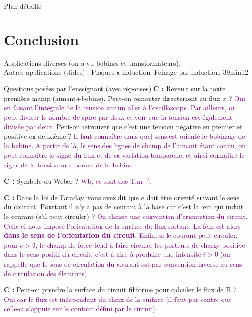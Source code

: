 \begin{reportBlock}{Plan détaillé}
\vspace{1cm}
\section*{Conclusion} 
Applications diverses (on a vu bobines et transformateurs). \\
Autres applications (slides) : Plaques à induction, Feinage par induction.\newline
39min12
\end{reportBlock}


\begin{reportBlock}{Questions posées par l’enseignant (avec réponses)}
  \textbf{C :} Revenir sur la toute première manip (aimant+bobine). Peut-on remonter directement au flux $\phi$ ? \textcolor{purple}{Oui en faisant l'intégrale de la tension sur un aller à l'oscilloscope. Par ailleurs, on peut diviser le nombre de spire par deux et voir que la tension est également divisée par deux.} Peut-on retrouver que c'est une tension négative en premier et positive en deuxième ? \textcolor{purple}{Il faut connaître dans quel sens est orienté le bobinage de la bobine. A partir de là, le sens des lignes de champ de l'aimant étant connu, on peut connaître le signe du flux et de sa variation temporelle, et ainsi connaître le signe de la tension aux bornes de la bobine.}\newline
  
  \textbf{C :} Symbole du Weber ? \textcolor{purple}{Wb, ce sont des T.m$^{-2}$.}\newline
  
  \textbf{C :} Dans la loi de Faraday, vous avez dit que $e$ doit être orienté suivant le sens du courant. Pourtant il n'y a pas de courant à la base car c'est la fem qui induit le courant (s'il peut circuler) ? \textcolor{purple}{On choisit une convention d'orientation du circuit. Celle-ci nous impose l'orientation de la surface du flux sortant. La fém est alors \textbf{dans le sens de l'orientation du circuit}. Enfin, si le courant peut circuler, pour $e>0$, le champ de force tend à faire circuler les porteurs de charge positive dans le sens positif du circuit, c'est-à-dire à produire une intensité $i>0$ (on rappelle que le sens de circulation du courant est par convention inverse au sens de circulation des électrons).}\newline
  
  \textbf{C :} Peut-on prendre la surface du circuit filiforme pour calculer le flux de B ? \textcolor{purple}{Oui car le flux est indépendant du choix de la surface (il faut par contre que celle-ci s'appuie sur le contour défini par le circuit).}\newline
  

\end{reportBlock}
